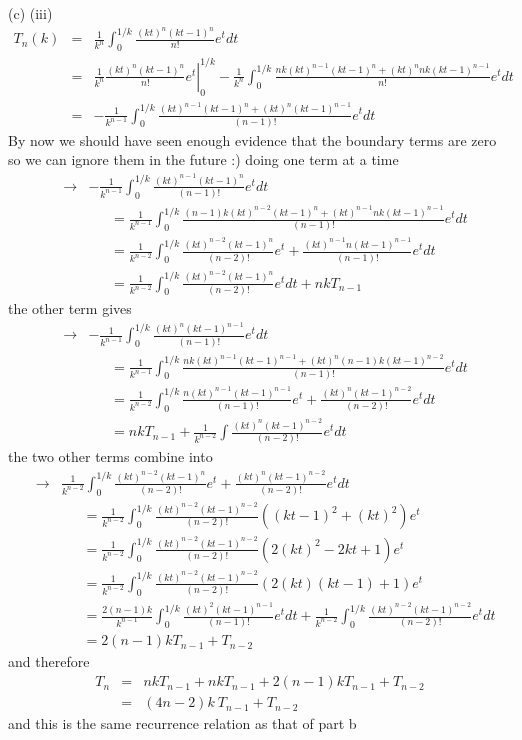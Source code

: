 \documentclass[aps,preprint,preprintnumbers,nofootinbib,showpacs,prd]{revtex4-1}
\newcommand{\nbea}{\begin{eqnarray*}}
\newcommand{\neea}{\end{eqnarray*}}
\begin{document}
(c) (iii) 
%
\nbea
T_n (k) & = & \frac{1}{k^n} \int_0^{1/k} \frac{(kt)^n (kt - 1)^n}{n!}e^tdt \\
& = & \left.\frac{1}{k^n}\frac{(kt)^n (kt - 1)^n}{n!}e^t \right|^{1/k}_0 - \frac{1}{k^n} \int_0^{1/k} \frac{nk(kt)^{n-1} (kt - 1)^n + (kt)^n nk(kt - 1)^{n-1}}{n!}e^tdt \\
& = & -\frac{1}{k^{n-1}} \int_0^{1/k} \frac{(kt)^{n-1} (kt - 1)^n + (kt)^n (kt - 1)^{n-1}}{(n-1)!}e^tdt
\neea
%
By now we should have seen enough evidence that the boundary terms are zero so we can ignore them in the future :) doing one term at a time
%
\nbea
& \to &-\frac{1}{k^{n-1}} \int_0^{1/k} \frac{(kt)^{n-1} (kt - 1)^n}{(n-1)!}e^tdt \\
& &~~~~~~~ = \frac{1}{k^{n-1}} \int_0^{1/k} \frac{(n-1)k(kt)^{n-2} (kt - 1)^n + (kt)^{n-1} nk (kt - 1)^{n-1}}{(n-1)!}e^tdt \\
& &~~~~~~~ = \frac{1}{k^{n-2}}\int_0^{1/k} \frac{(kt)^{n-2} (kt - 1)^n}{(n-2)!}e^t + \frac{(kt)^{n-1} n (kt - 1)^{n-1}}{(n-1)!}e^tdt \\
& &~~~~~~~ = \frac{1}{k^{n-2}}\int_0^{1/k} \frac{(kt)^{n-2} (kt - 1)^n}{(n-2)!}e^t dt + nkT_{n-1}
\neea
%
the other term gives
%
\nbea
& \to &-\frac{1}{k^{n-1}} \int_0^{1/k} \frac{(kt)^{n} (kt - 1)^{n-1}}{(n-1)!}e^tdt \\
& &~~~~~~~ = \frac{1}{k^{n-1}} \int_0^{1/k} \frac{nk(kt)^{n-1} (kt - 1)^{n-1} + (kt)^n (n-1)k (kt - 1)^{n-2}}{(n-1)!}e^tdt \\
& &~~~~~~~ = \frac{1}{k^{n-2}}\int_0^{1/k} \frac{n(kt)^{n-1} (kt - 1)^{n-1}}{(n-1)!}e^t + \frac{(kt)^n (kt - 1)^{n-2}}{(n-2)!}e^tdt \\
& &~~~~~~~ = nkT_{n-1} + \frac{1}{k^{n-2}}\int\frac{(kt)^n (kt - 1)^{n-2}}{(n-2)!}e^tdt
\neea
%
the two other terms combine into
%
\nbea
& \to & \frac{1}{k^{n-2}}\int_0^{1/k} \frac{(kt)^{n-2} (kt - 1)^n}{(n-2)!}e^t + \frac{(kt)^n (kt - 1)^{n-2}}{(n-2)!}e^tdt \\
& &~~~~~~~ = \frac{1}{k^{n-2}}\int_0^{1/k} \frac{(kt)^{n-2} (kt - 1)^{n-2}}{(n-2)!} ((kt - 1)^{2} + (kt)^2) e^t \\
& &~~~~~~~ = \frac{1}{k^{n-2}}\int_0^{1/k} \frac{(kt)^{n-2} (kt - 1)^{n-2}}{(n-2)!} (2(kt)^2 - 2kt + 1) e^t \\
& &~~~~~~~ = \frac{1}{k^{n-2}}\int_0^{1/k} \frac{(kt)^{n-2} (kt - 1)^{n-2}}{(n-2)!} (2(kt)(kt - 1) + 1) e^t \\
& &~~~~~~~ = \frac{2(n-1)k}{k^{n-1}}\int_0^{1/k} \frac{(kt)^{2} (kt - 1)^{n-1}}{(n-1)!} e^t dt +\frac{1}{k^{n-2}}\int_0^{1/k} \frac{(kt)^{n-2} (kt - 1)^{n-2}}{(n-2)!} e^t dt \\
& &~~~~~~~ = 2(n-1)kT_{n-1} + T_{n-2}
\neea
%
and therefore
%
\nbea
T_n & = & nkT_{n-1} + nkT_{n-1} + 2(n-1)kT_{n-1} + T_{n-2} \\
& = & (4n - 2)k~T_{n-1} + T_{n-2}
\neea
%
and this is the same recurrence relation as that of part b
\end{document}
